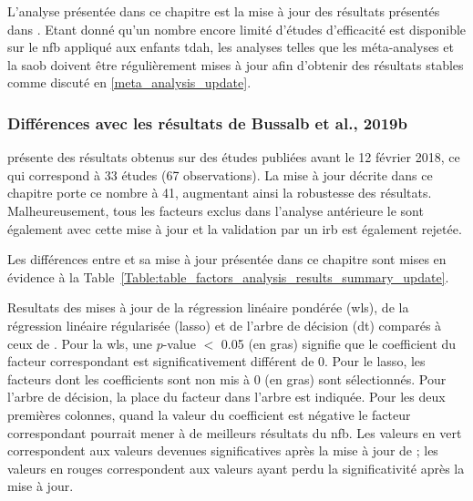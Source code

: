 L'analyse présentée dans ce chapitre est la mise à jour des résultats présentés dans \citet{Bussalb2019clinical}. Etant donné qu'un nombre encore limité d'études
d'efficacité est disponible sur le \gls{nfb} appliqué aux enfants \gls{tdah}, les analyses telles que les méta-analyses et la \gls{saob} doivent être régulièrement mises
à jour afin d'obtenir des résultats stables comme discuté en \ref{meta_analysis_update}.

\subsubsection{Différences avec les résultats de Bussalb et al., 2019b}
\citet{Bussalb2019clinical} présente des résultats obtenus sur des études publiées avant le 12 février 2018, ce qui correspond à 33 études (67 observations). La mise 
à jour décrite dans ce chapitre porte ce nombre à 41, augmentant ainsi la robustesse des
résultats. Malheureusement, tous les facteurs exclus dans l'analyse antérieure le sont également avec cette mise à jour et la validation par
un \gls{irb} est également rejetée.

Les différences entre \citet{Bussalb2019clinical} et sa mise à jour présentée dans ce chapitre sont mises en évidence à la 
Table~\ref{Table:table_factors_analysis_results_summary_update}.

\begin{table}[h!]
  \centering
  \caption{Resultats des mises à jour de la régression linéaire pondérée (\gls{wls}), de la régression linéaire régularisée (\gls{lasso}) et de l'arbre de décision (\gls{dt})
	comparés à ceux de \citet{Bussalb2019clinical}. Pour la \gls{wls}, une $p$-value $<$ 0.05 
	(en gras) signifie que le coefficient du facteur correspondant est significativement différent de 0. Pour le \gls{lasso}, les facteurs dont les coefficients sont non mis à 0 (en gras) sont 
	sélectionnés. Pour l'arbre de décision, la place du facteur dans l'arbre est indiquée. Pour les deux premières colonnes, quand la valeur du coefficient est négative le facteur 
	correspondant pourrait mener à de meilleurs résultats du \gls{nfb}. Les valeurs en vert correspondent aux valeurs devenues significatives après la mise à jour de \citet{Bussalb2019clinical}; les valeurs
	en rouges correspondent aux valeurs ayant perdu la significativité après la mise à jour.}
  
  \label{Table:table_factors_analysis_results_summary_update}
\end{table}

